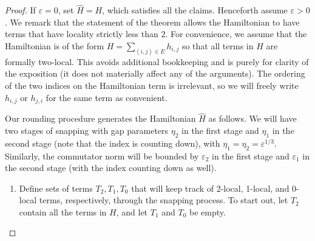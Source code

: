 \documentclass[a4paper,onecolumn,11pt]{quantumarticle}
\theoremstyle{plain}
\newcommand{\eps}{\varepsilon}
\begin{document}
\begin{proof}
If $\eps=0$, set $\hat{H}=H$, which satisfies all the claims. Henceforth assume $\eps>0$.
We remark that the statement of the theorem allows the Hamiltonian to have terms that have locality strictly less than $2$. For convenience, we assume that the Hamiltonian is of the form $H = \sum_{(i,j) \in E} h_{i,j}$ so that all terms in $H$ are formally two-local. This avoids additional bookkeeping and is purely for clarity of the exposition (it does not materially affect any of the arguments). The ordering of the two indices on the Hamiltonian term is irrelevant, so we will freely write $h_{i,j}$ or $h_{j,i}$ for the same term as convenient.

Our rounding procedure generates the Hamiltonian $\hat{H}$ as follows. We will have two stages of snapping with gap parameters $\eta_2$ in the first stage and $\eta_1$ in the second stage (note that the index is counting down), with $\eta_1=\eta_2=\eps^{1/3}$. Similarly, the commutator norm will be bounded by $\eps_2$ in the first stage and $\eps_1$ in the second stage (with the index counting down as well).

\begin{enumerate}

    \item Define sets of terms $T_2, T_1, T_0$ that will keep track of 2-local, 1-local, and 0-local terms, respectively, through the snapping process. To start out, let $T_2$ contain all the terms in $H$, and let $T_1$ and $T_0$ be empty.
    

\end{enumerate}
\end{proof}
\end{document}
